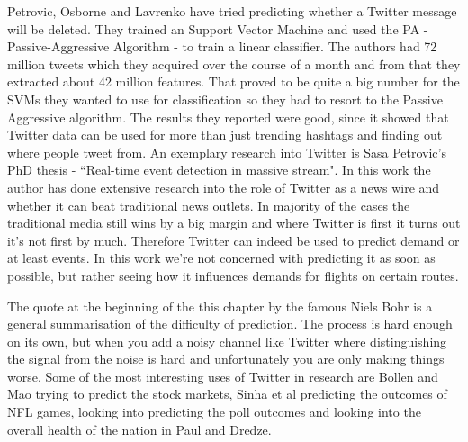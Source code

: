 \documentclass[minf,twoside,singlespacing,parskip,notimes,deptreport]{infthesis} %
\begin{document}
Petrovic, Osborne and Lavrenko\cite{Miles2} have tried predicting whether a Twitter message will be deleted. 
They trained an Support Vector Machine and used the PA -  Passive-Aggressive Algorithm - to train a linear classifier. 
The authors had 72 million tweets which they acquired over the course of a month and from that they extracted about 42 million features. That proved to be quite a big number for the SVMs they wanted to use for classification so they had to resort to the Passive Aggressive algorithm. The results they reported were good, since it showed that Twitter data can be used for more than just trending hashtags and finding out where people tweet from. 
An exemplary research into Twitter is Sasa Petrovic's PhD thesis - ``Real-time event detection in massive stream"\cite{Petrovic2012}. 
In this work the author has done extensive research into the role of Twitter as a news wire and whether it can beat traditional news outlets. 
In majority of the cases the traditional media still wins by a big margin and where Twitter is first it turns out it's not first by much. 
 Therefore Twitter can indeed be used to predict demand or at least events. 
 In this work we're not concerned with predicting it as soon as possible, but rather seeing how it influences demands for flights on certain routes.

The quote at the beginning of the this chapter by the famous Niels Bohr is a general summarisation of the difficulty of prediction. The process is hard enough on its own, but when you add a noisy channel like Twitter where distinguishing the signal from the noise is hard and unfortunately you are only making things worse. Some of the most interesting uses of Twitter in research are Bollen and Mao trying to predict the stock markets\cite{twitstock}, Sinha et al predicting the outcomes of NFL games\cite{twitnfl}, looking into predicting the poll outcomes\cite{twitpoll} and looking into the overall health of the nation in Paul and Dredze\cite{twitflu}.
\end{document}
